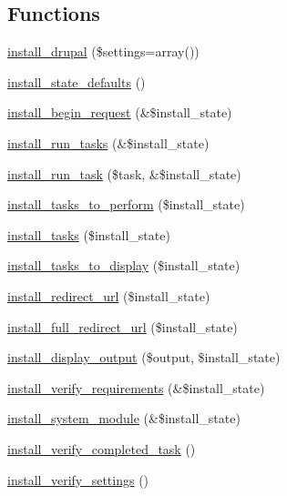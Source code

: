 \subsection*{Functions}
\begin{DoxyCompactItemize}
\item 
\hyperlink{install_8core_8inc_ae451893f8ee7ea51f1467cec82a51fad}{install\_\-drupal} (\$settings=array())
\item 
\hyperlink{install_8core_8inc_ab52bef71652d133045e4182da84a33b8}{install\_\-state\_\-defaults} ()
\item 
\hyperlink{install_8core_8inc_a4c7572aea2e36952bbd5e73e22eb66f8}{install\_\-begin\_\-request} (\&\$install\_\-state)
\item 
\hyperlink{install_8core_8inc_a8ea31b06c1d5a973906d0e9b5cfa946e}{install\_\-run\_\-tasks} (\&\$install\_\-state)
\item 
\hyperlink{install_8core_8inc_aed4e27f03b3779541b3ea5b00506f410}{install\_\-run\_\-task} (\$task, \&\$install\_\-state)
\item 
\hyperlink{install_8core_8inc_a02b255f3c91fa330972d77e41c0b26c4}{install\_\-tasks\_\-to\_\-perform} (\$install\_\-state)
\item 
\hyperlink{install_8core_8inc_a243570ad640fab913f1c14cc750d3194}{install\_\-tasks} (\$install\_\-state)
\item 
\hyperlink{install_8core_8inc_ab265ac63af5ca0c96ab6278be25e6776}{install\_\-tasks\_\-to\_\-display} (\$install\_\-state)
\item 
\hyperlink{install_8core_8inc_a6653d055f5af1ec01fa9769b41f747b5}{install\_\-redirect\_\-url} (\$install\_\-state)
\item 
\hyperlink{install_8core_8inc_a562ee3011859e71bb87c068340ce6dc6}{install\_\-full\_\-redirect\_\-url} (\$install\_\-state)
\item 
\hyperlink{install_8core_8inc_aadf48482ac0487e79f48b346dc550806}{install\_\-display\_\-output} (\$output, \$install\_\-state)
\item 
\hyperlink{install_8core_8inc_a6cd2658e0f95bd0d5ce8942aa5884124}{install\_\-verify\_\-requirements} (\&\$install\_\-state)
\item 
\hyperlink{install_8core_8inc_a8aa087a6aedfb74d1ad361f2269dbd06}{install\_\-system\_\-module} (\&\$install\_\-state)
\item 
\hyperlink{install_8core_8inc_a0c550ddc08ed7884ffdfc444c85d4a3a}{install\_\-verify\_\-completed\_\-task} ()
\item 
\hyperlink{install_8core_8inc_ab9be391a3ce3d42b0a75b2abe95b5232}{install\_\-verify\_\-settings} ()

\end{DoxyCompactItemize}
